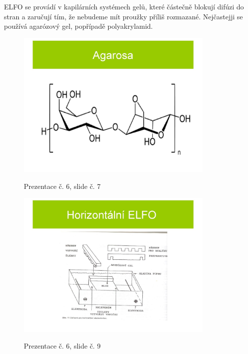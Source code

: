 \documentclass[DIV=8]{scrreprt}
\begin{document}
ELFO se provádí v kapilárních systémech gelů, které částečně blokují difúzi do stran a zaručují tím, že nebudeme mít proužky příliš rozmazané. Nejčastejji se používá agarózový gel, popřípadě polyakrylamid.

\begin{figure}
    \caption{Prezentace č. 6, slide č. 7}
    \includegraphics[width=0.85\textwidth]{slides-6/slide-7.jpg}
    \centering
    \label{slides-6-slide-7}
\end{figure}
\begin{figure}
    \caption{Prezentace č. 6, slide č. 9}
    \includegraphics[width=0.85\textwidth]{slides-6/slide-9.jpg}
    \centering
    \label{slides-6-slide-9}
\end{figure}
\end{document}

